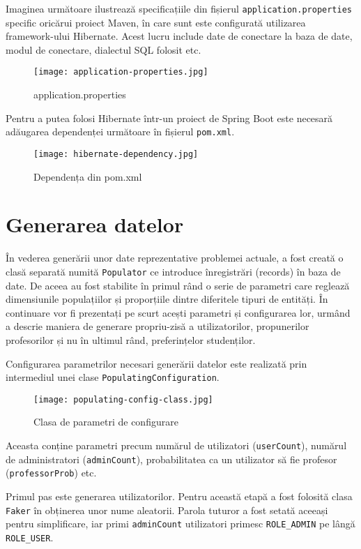 Imaginea următoare ilustrează specificațiile din fișierul \texttt{application.properties} specific oricărui proiect Maven, în care sunt este configurată utilizarea framework-ului Hibernate. Acest lucru include date de conectare la baza de date, modul de conectare, dialectul SQL folosit etc.

\begin{figure}[H]
	\centering
	\texttt{[image: application-properties.jpg]}
	\caption{application.properties}
\end{figure}

Pentru a putea folosi Hibernate într-un proiect de Spring Boot este necesară adăugarea dependenței următoare în fișierul \texttt{pom.xml}.

\begin{figure}[H]
	\centering
	\texttt{[image: hibernate-dependency.jpg]}
	\caption{Dependența din pom.xml}
\end{figure}

\section{Generarea datelor}

În vederea generării unor date reprezentative problemei actuale, a fost creată o clasă separată numită \texttt{Populator} ce introduce înregistrări (records) în baza de date. De aceea au fost stabilite în primul rând o serie de parametri care reglează dimensiunile populațiilor și proporțiile dintre diferitele tipuri de entități. În continuare vor fi prezentați pe scurt acești parametri și configurarea lor, urmând a descrie maniera de generare propriu-zisă a utilizatorilor, propunerilor profesorilor și nu în ultimul rând, preferințelor studenților.

Configurarea parametrilor necesari generării datelor este realizată prin intermediul unei clase \texttt{PopulatingConfiguration}.

\begin{figure}[H]
	\centering
	\texttt{[image: populating-config-class.jpg]}
	\caption{Clasa de parametri de configurare}
\end{figure}

Aceasta conține parametri precum numărul de utilizatori (\texttt{userCount}), numărul de administratori (\texttt{adminCount}), probabilitatea ca un utilizator să fie profesor 
(\texttt{professorProb}) etc.

Primul pas este generarea utilizatorilor. Pentru această etapă a fost folosită clasa \texttt{Faker} în obținerea unor nume aleatorii. Parola tuturor a fost setată aceeași pentru simplificare, iar primi \texttt{adminCount} utilizatori primesc \texttt{ROLE\_ADMIN} pe lângă \texttt{ROLE\_USER}.

